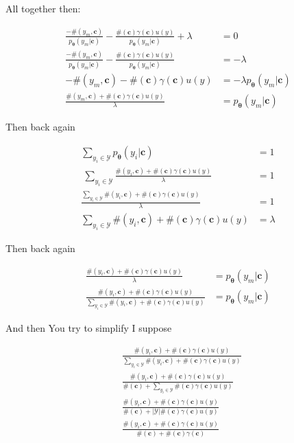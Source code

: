 \documentclass{article}
\newcommand{\vtheta}{\boldsymbol{\theta}}
\newcommand{\model}{p_{\vtheta}}
\newcommand{\context}{\boldsymbol{c}}
\begin{document}
			All together then:
			
			\begin{align}
				\frac{-\#(y_m, \context)}{\model(y_m|\context)} -\frac{\#(\context)\gamma(\context)u(y)}{\model(y_m|\context)} +\lambda &= 0\\
				\frac{-\#(y_m, \context)}{\model(y_m|\context)} -\frac{\#(\context)\gamma(\context)u(y)}{\model(y_m|\context)}  &= -\lambda	\\
				-\#(y_m, \context) -\#(\context)\gamma(\context)u(y)  &= -\lambda \model(y_m|\context)\\
				\frac{\#(y_m, \context) +\#(\context)\gamma(\context)u(y)}{\lambda}  &= \model(y_m|\context)	
			\end{align}
		
			Then back again
			
			\begin{align}
				\sum_{y_i\in\mathcal{Y}} \model(y_i|\context) &= 1\\\
				\sum_{y_i\in\mathcal{Y}} \frac{\#(y_i, \context) +\#(\context)\gamma(\context)u(y)}{\lambda} &= 1\\
				\frac{ \sum_{y_i\in\mathcal{Y}} \#(y_i, \context) +\#(\context)\gamma(\context)u(y)}{\lambda} &= 1\\
				 \sum_{y_i\in\mathcal{Y}} \#(y_i, \context) +\#(\context)\gamma(\context)u(y) &= \lambda
			\end{align}
			
			Then back again
		
			\begin{align}
				\frac{\#(y_i, \context) +\#(\context)\gamma(\context)u(y)}{\lambda}  &= \model(y_m|\context)\\
				\frac{\#(y_i, \context) +\#(\context)\gamma(\context)u(y)}{\sum_{y_i\in\mathcal{Y}} \#(y_i, \context) +\#(\context)\gamma(\context)u(y)}  &= \model(y_m|\context)	
			\end{align}
			
			And then You try to simplify I suppose
			
			\begin{align}
				&\frac{\#(y_i, \context) +\#(\context)\gamma(\context)u(y)}{\sum_{y_i\in\mathcal{Y}} \#(y_i, \context) +\#(\context)\gamma(\context)u(y)}\\
				&\frac{\#(y_i, \context) +\#(\context)\gamma(\context)u(y)}{ \#(\context) + \sum_{y_i\in\mathcal{Y}} \#(\context)\gamma(\context)u(y)}\\
				&\frac{\#(y_i, \context) +\#(\context)\gamma(\context)u(y)}{ \#(\context) + |\mathcal{Y}|\#(\context)\gamma(\context)u(y)}\\
				&\frac{\#(y_i, \context) +\#(\context)\gamma(\context)u(y)}{ \#(\context) + \#(\context)\gamma(\context)}	
			\end{align}
	
\end{document}
